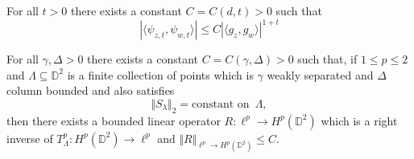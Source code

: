 \documentclass[10pt,a4paper]{amsart}
\begin{document}
\begin{lem} \label{prop:psi_estimate}
	For all $t>0$ there exists a constant $C=C(d, t)>0$ such that 
	\[ | \langle \psi_{z,t}, \psi_{w,t} \rangle| \leq C| \langle g_z , g_w \rangle |^{1+t} \]
\end{lem}

\begin{prop}
\label{prop:bound_inv}
	For all $\gamma, \Delta>0$ there exists a constant $C=C(\gamma,\Delta)>0$ such that, if $1\le p \le2$ and $ \Lambda \subseteq \mathbb{D}^2$ is a finite collection of points which is  $\gamma$  weakly separated and $\Delta$ column bounded  and also satisfies 
	\[ \Vert S_\lambda \Vert_2 = \text{constant on} \,\,\, \Lambda, \]
	then there exists a bounded linear operator $R: \ell^p \to H^p(\mathbb{D}^2)	 $ which is a right inverse of $T_\Lambda^p: H^p(\mathbb{D}^2) \to \ell^p $ and $\Vert R\Vert_{\ell^p\to H^p(\mathbb{D}^2)}\leq C. $   
\end{prop}
\end{document}
